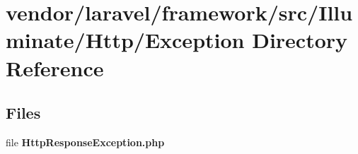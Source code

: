 \section{vendor/laravel/framework/src/\+Illuminate/\+Http/\+Exception Directory Reference}
\label{dir_26065766e7cfe7af9602dd56e6d5cdba}
\subsection*{Files}
\begin{DoxyCompactItemize}
\item 
file {\bf Http\+Response\+Exception.\+php}
\end{DoxyCompactItemize}
